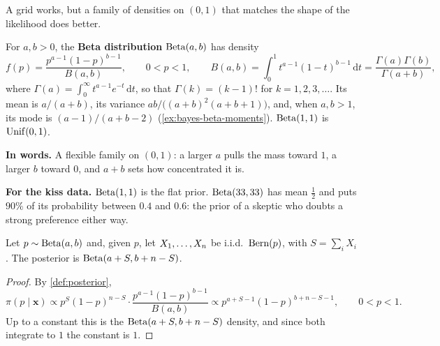A grid works, but a family of densities on $(0, 1)$ that matches the shape of the likelihood does better.

\begin{definition}
\label{def:beta}
For $a, b > 0$, the \textbf{Beta distribution} $\mathrm{Beta}(a, b)$ has density
\[
f(p) = \frac{p^{a-1}(1 - p)^{b-1}}{B(a, b)}, \qquad 0 < p < 1, \qquad B(a, b) = \int_0^1 t^{a-1}(1 - t)^{b-1}\,\mathrm{d}t = \frac{\Gamma(a)\Gamma(b)}{\Gamma(a + b)},
\]
where $\Gamma(a) = \int_0^\infty t^{a-1}e^{-t}\,\mathrm{d}t$, so that $\Gamma(k) = (k - 1)!$ for $k = 1, 2, 3, \ldots$. Its mean is $a/(a + b)$, its variance $ab/\big((a + b)^2(a + b + 1)\big)$, and, when $a, b > 1$, its mode is $(a - 1)/(a + b - 2)$ (\cref{ex:bayes-beta-moments}). $\mathrm{Beta}(1, 1)$ is $\mathrm{Unif}(0, 1)$.
\end{definition}

\begin{inwords}
\textbf{In words.} A flexible family on $(0, 1)$: a larger $a$ pulls the mass toward $1$, a larger $b$ toward $0$, and $a + b$ sets how concentrated it is.
\par\smallskip
\textbf{For the kiss data.} $\mathrm{Beta}(1, 1)$ is the flat prior. $\mathrm{Beta}(33, 33)$ has mean $\frac12$ and puts $90\%$ of its probability between $0.4$ and $0.6$: the prior of a skeptic who doubts a strong preference either way.
\end{inwords}

\begin{theorem}
\label{thm:beta-bernoulli}
Let $p \sim \mathrm{Beta}(a, b)$ and, given $p$, let $X_1, \ldots, X_n$ be i.i.d.\ $\text{Bern}(p)$, with $S = \sum_i X_i$. The posterior is $\mathrm{Beta}(a + S, b + n - S)$.
\end{theorem}

\begin{proof}
By \cref{def:posterior},
\[
\pi(p \mid \mathbf{x}) \propto p^S(1 - p)^{n - S} \cdot \frac{p^{a-1}(1 - p)^{b-1}}{B(a, b)} \propto p^{a + S - 1}(1 - p)^{b + n - S - 1}, \qquad 0 < p < 1.
\]
Up to a constant this is the $\mathrm{Beta}(a + S, b + n - S)$ density, and since both integrate to $1$ the constant is $1$.
\end{proof}

